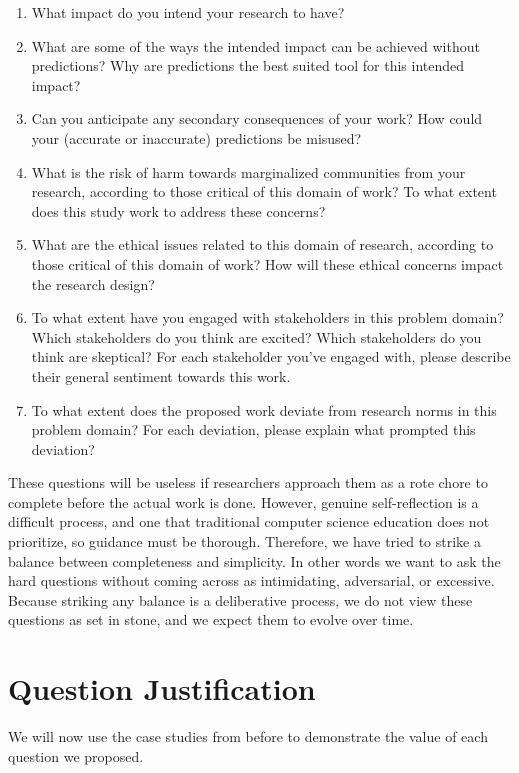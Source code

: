 \documentclass[12pt]{article}
\begin{document}
    \begin{enumerate}
        \item What impact do you intend your research to have? 
        \item What are some of the ways the intended impact can be achieved without predictions? Why are predictions the best suited tool for this intended impact? 
        \item Can you anticipate any secondary consequences of your work? How could your (accurate or inaccurate) predictions be misused?
        \item What is the risk of harm towards marginalized communities from your research, according to those critical of this domain of work? To what extent does this study work to address these concerns?
        \item What are the ethical issues related to this domain of research, according to those critical of this domain of work? How will these ethical concerns impact the research design?
        \item To what extent have you engaged with stakeholders in this problem domain? Which stakeholders do you think are excited? Which stakeholders do you think are skeptical? For each stakeholder you've engaged with, please describe their general sentiment towards this work. 
        \item To what extent does the proposed work deviate from research norms in this problem domain? For each deviation, please explain what prompted this deviation?
    \end{enumerate}
    
    These questions will be useless if researchers approach them as a rote chore to complete before the actual work is done. However, genuine self-reflection is a difficult process, and one that traditional computer science education does not prioritize, so guidance must be thorough. Therefore, we have tried to strike a balance between completeness and simplicity. In other words we want to ask the hard questions without coming across as intimidating, adversarial, or excessive. Because striking any balance is a deliberative process, we do not view these questions as set in stone, and we expect them to evolve over time. 
    
\section{Question Justification}

    We will now use the case studies from before to demonstrate the value of each question we proposed. 
\end{document}
